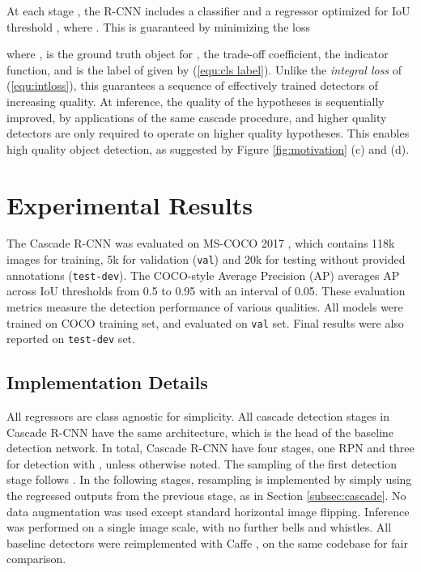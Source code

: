 \documentclass[10pt,twocolumn,letterpaper]{article}
\begin{document}
At each stage , the R-CNN includes a classifier  and a
regressor  optimized for IoU threshold , where .
This is guaranteed by minimizing the loss

where ,  is the ground
truth object for ,  the trade-off coefficient,  the
indicator function, and  is the label of  given 
by (\ref{equ:cls label}). Unlike the \textit{integral loss} of
(\ref{equ:intloss}), this guarantees a sequence of effectively trained detectors of increasing quality. At inference, the quality of the hypotheses is sequentially improved, by applications of the same cascade procedure, and higher quality detectors are only required to operate on higher quality hypotheses. This enables high quality object detection, as suggested by Figure \ref{fig:motivation} (c) and (d).


\section{Experimental Results}

The Cascade R-CNN was evaluated on MS-COCO 2017 \cite{DBLP:conf/eccv/LinMBHPRDZ14}, which contains 118k images for training, 5k for validation (\texttt{val}) and 20k for testing without provided annotations (\texttt{test-dev}). The COCO-style Average Precision (AP) averages AP across IoU thresholds from 0.5 to 0.95 with an interval of 0.05. These evaluation metrics measure the detection performance of various qualities. All models were trained on COCO training set, and evaluated on \texttt{val} set. Final results were also reported on \texttt{test-dev} set.

\subsection{Implementation Details}

All regressors are class agnostic for simplicity. All cascade detection stages in Cascade R-CNN have the same architecture, which is the head of the baseline detection network. In total, Cascade R-CNN have four stages, one RPN and three for detection with , unless otherwise noted. The sampling of the first detection stage follows \cite{DBLP:conf/iccv/Girshick15,DBLP:conf/nips/RenHGS15}. In the following stages, resampling is implemented by simply using
the regressed outputs from the previous stage, as in
Section \ref{subsec:cascade}. No data augmentation was used except standard horizontal image flipping. Inference was performed on a single image scale, with no further bells and whistles. All baseline detectors were reimplemented with Caffe \cite{DBLP:conf/mm/JiaSDKLGGD14}, on the same codebase for fair comparison.
\end{document}
